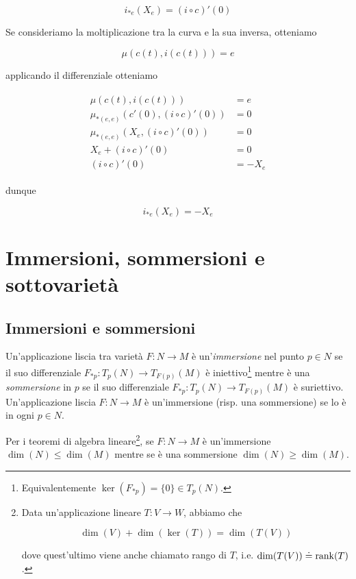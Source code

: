 \begin{equation}
	i_{*e}(X_{e}) = (i \circ c)'(0)
\end{equation}

Se consideriamo la moltiplicazione tra la curva e la sua inversa, otteniamo

\begin{equation}
	\mu(c(t),i(c(t))) = e
\end{equation}

applicando il differenziale otteniamo

\begin{align}
	\begin{split}
		\mu(c(t),i(c(t))) &= e\\
		\mu_{*(e,e)}(c'(0),(i \circ c)'(0)) &= 0\\
		\mu_{*(e,e)}(X_{e},(i \circ c)'(0)) &= 0\\
		X_{e} + (i \circ c)'(0) &= 0\\
		(i \circ c)'(0) &= - X_{e}
	\end{split}
\end{align}

dunque

\begin{equation}
	i_{*e}(X_{e}) = - X_{e}
\end{equation}

\section{Immersioni, sommersioni e sottovarietà}

\subsection{Immersioni e sommersioni}

Un'applicazione liscia tra varietà $ F : N \to M $ è un'\textit{immersione} nel punto $ p \in N $ se il suo differenziale $ F_{*p} : T_{p}(N) \to T_{F(p)}(M) $ è iniettivo\footnote{%
	Equivalentemente $ \ker(F_{*p}) = \{0\} \in T_{p}(N) $.%
} mentre è una \textit{sommersione} in $ p $ se il suo differenziale $ F_{*p} : T_{p}(N) \to T_{F(p)}(M) $ è suriettivo.\\
Un'applicazione liscia $ F : N \to M $ è un'immersione (risp. una sommersione) se lo è in ogni $ p \in N $.

\begin{remark}
	Per i teoremi di algebra lineare\footnote{%
		Data un'applicazione lineare $ T : V \to W $, abbiamo che
		
		\begin{equation}
			\dim(V) + \dim(\ker(T)) = \dim(T(V))
		\end{equation}
		
		dove quest'ultimo viene anche chiamato rango di $ T $, i.e. $ \dim(T(V)) \doteq \rank(T) $.%
	}, se $ F : N \to M $ è un'immersione $ \dim(N) \leqslant \dim(M) $ mentre se è una sommersione $ \dim(N) \geqslant \dim(M) $.
\end{remark}


